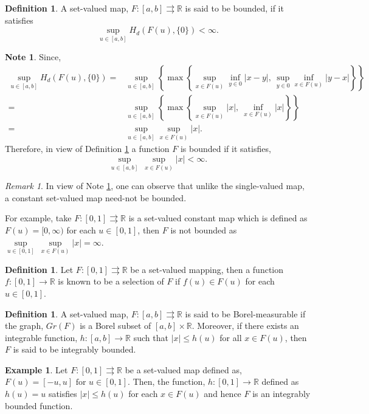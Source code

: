 \documentclass[a4paper,12pt,reqno]{amsart}
\numberwithin{equation}{section}
\theoremstyle{definition}
\newtheorem{definition}[theorem]{Definition}
\newtheorem{example}[theorem]{Example}
\newtheorem{note}[theorem]{Note}
\theoremstyle{remark}
\newtheorem{remark}[theorem]{Remark}
\numberwithin{equation}{section}
\begin{document}
\begin{definition}\label{Bound}
A set-valued map, $F:[a,b]\rightrightarrows \mathbb{R}$ is said to be bounded, if it satisfies
\[\sup_{u\in [a,b]}H_{d}(F(u),\{0\})<\infty.\]
\end{definition}
\begin{note}\label{nt2.8} \label{NOTE}
Since, 
\begin{align*}
   \sup_{u\in [a,b]}H_d(F(u),\{0\})=&\sup_{u\in [a,b]}\left\{ \max \left\{\sup_{x\in F(u)}\inf_{y\in {0}}\lvert x-y \rvert,~ \sup_{y\in {0}}\inf_{x\in F(u)}\lvert y-x \rvert\right\} \right\}\\
   =& \sup_{u\in [a,b]}\left\{ \max \left\{\sup_{x\in F(u)}\lvert x \rvert,~ \inf_{x\in F(u)}\lvert x \rvert\right\} \right\}\\
   =& \sup_{u\in [a,b]} \sup_{x\in F(u)} \lvert x \rvert.
\end{align*}
Therefore, in view of Definition \ref{Bound} a function $F$ is bounded if it satisfies,
\begin{equation}\label{Eq1}
  \sup_{u\in [a,b]}~\sup_{x\in F(u)} \lvert x \rvert < \infty.  
\end{equation}
\end{note}

\begin{remark}
In view of Note \ref{nt2.8}, one can observe that unlike the single-valued map, a constant set-valued map need-not be bounded. 

For example, take $F:[0,1]\rightrightarrows \mathbb{R}$ is a set-valued constant map which is defined as $F(u)=[0,\infty)$ for each $u\in [0,1]$, then $F$ is not bounded as $\underset{u\in [0,1]}{\sup}~ \underset{x\in F(u)}{\sup}\lvert x \rvert=\infty.$ 
\end{remark}

\begin{definition}
Let $F:[0,1]\rightrightarrows \mathbb{R}$ be a set-valued mapping, then a function $f:[0,1]\rightarrow \mathbb{R}$ is known to be a selection of $F$ if $f(u)\in F(u)$ for each $u\in [0,1].$
\end{definition}

\begin{definition}\cite{aumann1965integrals}
A set-valued map, $F:[a,b]\rightrightarrows \mathbb{R}$ is said to be Borel-measurable if the graph, $Gr(F)$ is a Borel subset of $[a,b]\times \mathbb{R}$. Moreover, if there exists an integrable function, $h:[a,b]\rightarrow \mathbb{R}$ such that $\lvert x \rvert \leq h(u)$ for all $x\in F(u)$, then $F$ is said to be integrably bounded.
\end{definition}
\begin{example}
Let $F:[0,1]\rightrightarrows \mathbb{R}$ be a set-valued map defined as,
$F(u)=[-u,u] \text{ for } u\in [0,1].$
Then, the function, $h:[0,1]\rightarrow \mathbb{R}$ defined as $h(u)=u$  satisfies $\lvert x \rvert \leq h(u)$ for each $x\in F(u)$ and hence $F$ is an integrably bounded function.
\end{example}
\end{document}
